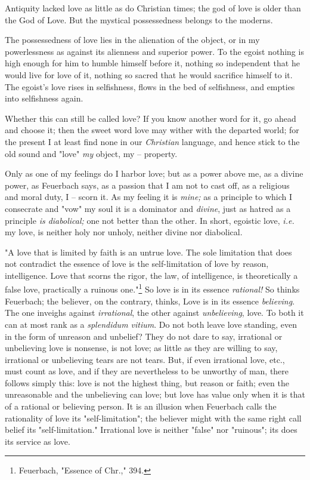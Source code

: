 Antiquity lacked love as little as do Christian times; the god of love is 
older than the God of Love. But the mystical possessedness belongs to the 
moderns.

The possessedness of love lies in the alienation of the object, or in my 
powerlessness as against its alienness and superior power. To the egoist 
nothing is high enough for him to humble himself before it, nothing so 
independent that he would live for love of it, nothing so sacred that he would 
sacrifice himself to it. The egoist's love rises in selfishness, flows in the 
bed of selfishness, and empties into selfishness again.

Whether this can still be called love? If you know another word for it, go 
ahead and choose it; then the sweet word love may wither with the departed 
world; for the present I at least find none in our \textit{Christian} 
language, and hence stick to the old sound and "{}love"{} \textit{my} object, 
my -- property.

Only as one of my feelings do I harbor love; but as a power above me, as a 
divine power, as Feuerbach says, as a passion that I am not to cast off, as a 
religious and moral duty, I -- scorn it. As my feeling it is \textit{mine;} as 
a principle to which I consecrate and "{}vow"{} my soul it is a dominator and 
\textit{divine}, just as hatred as a principle \textit{is diabolical;} one not 
better than the other. In short, egoistic love, \textit{i.e.} my love, is 
neither holy nor unholy, neither divine nor diabolical.

"{}A love that is limited by faith is an untrue love. The sole limitation that 
does not contradict the essence of love is the self-limitation of love by 
reason, intelligence. Love that scorns the rigor, the law, of intelligence, is 
theoretically a false love, practically a ruinous one."{}\footnote{Feuerbach, 
"{}Essence of Chr.,"{} 394.} So love is in its essence \textit{rational!} So 
thinks Feuerbach; the believer, on the contrary, thinks, Love is in its 
essence \textit{believing}. The one inveighs against \textit{irrational}, the 
other against \textit{unbelieving}, love. To both it can at most rank as a 
\textit{splendidum vitium}. Do not both leave love standing, even in the form 
of unreason and unbelief? They do not dare to say, irrational or unbelieving 
love is nonsense, is not love; as little as they are willing to say, 
irrational or unbelieving tears are not tears. But, if even irrational love, 
etc., must count as love, and if they are nevertheless to be unworthy of man, 
there follows simply this: love is not the highest thing, but reason or faith; 
even the unreasonable and the unbelieving can love; but love has value only 
when it is that of a rational or believing person. It is an illusion when 
Feuerbach calls the rationality of love its "{}self-limitation"{}; the 
believer might with the same right call belief its "{}self-limitation."{} 
Irrational love is neither "{}false"{} nor "{}ruinous"{}; its does its service 
as love.

